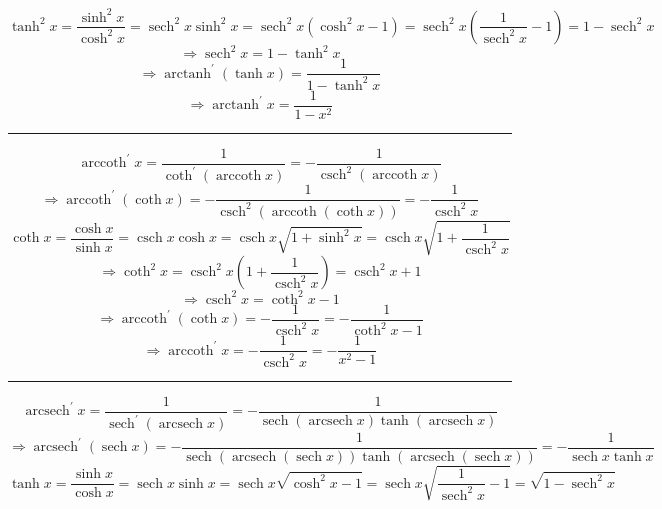 \documentclass[a0paper,landscape,fleqn]{article}
\DeclareMathOperator{\sech}{sech}
\DeclareMathOperator{\csch}{csch}
\DeclareMathOperator{\arctanh}{arctanh}
\DeclareMathOperator{\arccoth}{arccoth}
\DeclareMathOperator{\arcsech}{arcsech}
\begin{document}
\begin{equation*}
\tanh^2 x
=\frac{\sinh^2 x}{\cosh^2 x}
=\sech^2 x \sinh^2 x
=\sech^2 x (\cosh^2 x-1)
=\sech^2 x \left(\frac{1}{\sech^2 x}-1\right)
=1-\sech^2 x
\end{equation*}
\begin{equation*}
\Rightarrow\sech^2 x
=1-\tanh^2 x
\end{equation*}
\begin{equation*}
\Rightarrow\arctanh^\prime(\tanh x)
=\frac{1}{1-\tanh^2 x}
\end{equation*}
\begin{equation*}
\Rightarrow\arctanh^\prime x
=\frac{1}{1-x^2}
\end{equation*}
\hrule
\begin{equation*}
\arccoth^\prime x
=\frac{1}{\coth^\prime(\arccoth x)}
=-\frac{1}{\csch^2(\arccoth x)}
\end{equation*}
\begin{equation*}
\Rightarrow\arccoth^\prime(\coth x)
=-\frac{1}{\csch^2(\arccoth(\coth x))}
=-\frac{1}{\csch^2 x}
\end{equation*}
\begin{equation*}
\coth x
=\frac{\cosh x}{\sinh x}
=\csch x\cosh x
=\csch x\sqrt{1+\sinh^2 x}
=\csch x\sqrt{1+\frac{1}{\csch^2 x}}
\end{equation*}
\begin{equation*}
\Rightarrow\coth^2 x
=\csch^2 x\left(1+\frac{1}{\csch^2 x}\right)
=\csch^2 x+1
\end{equation*}
\begin{equation*}
\Rightarrow\csch^2 x
=\coth^2 x-1
\end{equation*}
\begin{equation*}
\Rightarrow\arccoth^\prime(\coth x)
=-\frac{1}{\csch^2 x}
=-\frac{1}{\coth^2 x-1}
\end{equation*}
\begin{equation*}
\Rightarrow\arccoth^\prime x
=-\frac{1}{\csch^2 x}
=-\frac{1}{x^2-1}
\end{equation*}
\hrule
\begin{equation*}
\arcsech^\prime x
=\frac{1}{\sech^\prime(\arcsech x)}
=-\frac{1}{\sech(\arcsech x)\tanh(\arcsech x)}
\end{equation*}
\begin{equation*}
\Rightarrow\arcsech^\prime(\sech x)
=-\frac{1}{\sech(\arcsech(\sech x))\tanh(\arcsech (\sech x))}
=-\frac{1}{\sech x\tanh x}
\end{equation*}
\begin{equation*}
\tanh x
=\frac{\sinh x}{\cosh x}
=\sech x\sinh x
=\sech x\sqrt{\cosh^2 x-1}
=\sech x\sqrt{\frac{1}{\sech^2 x}-1}
=\sqrt{1-\sech^2 x}
\end{equation*}
\end{document}
